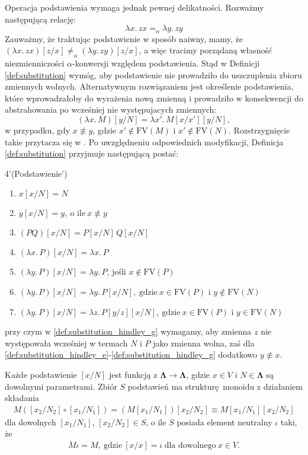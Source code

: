 Operacja podstawienia wymaga jednak pewnej delikatności. Rozważmy następującą relację:
\[
  \lambda x.\,zx=_{\alpha}\lambda y.\,zy
\]
Zauważmy, że traktując podstawienie w sposób naiwny, mamy, że \((\lambda x.\,zx)[z/x]\neq_{\alpha}(\lambda y.\,zy)[z/x]\), a więc tracimy porządaną własność niezmienniczości \(\alpha\)-konwersji względem podstawienia. Stąd w Definicji \ref{def:substitution} wymóg, aby podstawienie nie prowadziło do uszczuplenia zbioru zmiennych wolnych. Alternatywnym rozwiązaniem jest określenie podstawienia, które wprowadzałoby do wyrażenia nową zmienną i prowadziło w konsekwencji do abstrahowania po wcześniej nie występujacych zmiennych:
\[
  (\lambda x.\,M)[y/N] = \lambda x'.\,M[x/x'][y/N],
\]
w przypadku, gdy \(x\not\equiv y\), gdzie \(x'\not\in\mathrm{FV}(M)\) i \(x'\not\in\mathrm{FV}(N)\). Rozstrzygnięcie takie przytacza się w \cite{Hindley:2008:LCI:1388400,}. Po uwzględneniu odpowiednich modyfikacji, Definicja \ref{def:substitution} przyjmuje następującą postać:
\begin{customdef}{4'}(Podstawienie')\label{def:untyped_substitution_hindley}
  \begin{enumerate}[label={(S'\arabic*)}, ref={(S'\arabic*)}]
    \setlength\itemsep{0em}
    \item \(x[x/N] = N\)
    \item \(y[x/N] = y,\ \text{o ile}\ x\not\equiv y\)
    \item \((PQ)[x/N] = P[x/N]\,Q[x/N]\)
    \item \((\lambda x.\, P)[x/N] = \lambda x.\,P\)
    \item \((\lambda y.\, P)[x/N] = \lambda y.\,P\), jeśli \(x\not\in\mathrm{FV}(P)\)\label{def:substitution_e}\label{def:substitution_hindley_e}
    \item \((\lambda y.\, P)[x/N] = \lambda y.\,P[x/N],\ \text{gdzie}\ x\in\mathrm{FV}(P)\) i \(y\not\in\mathrm{FV}(N)\)\label{def:substitution_hindley_f}
    \item \((\lambda y.\, P)[x/N] = \lambda z.\,P[y/z][x/N],\ \text{gdzie}\ x\in\mathrm{FV}(P)\) i \(y\in\mathrm{FV}(N)\)\label{def:substitution_hindley_g}
  \end{enumerate}
  przy czym w \ref{def:substitution_hindley_g} wymagamy, aby zmienna \(z\) nie występowała wcześniej w termach \(N\) i \(P\) jako zmienna wolna, zaś dla \ref{def:substitution_hindley_e}-\ref{def:substitution_hindley_g} dodatkowo \(y\not\equiv x\).
\end{customdef}
\begin{uwaga}
Każde podstawienie \([x/N]\) jest funkcją z \(\mathbf{\Lambda}\to\mathbf{\Lambda}\), gdzie \(x\in V\) i \(N\in\mathbf{\Lambda}\) są dowolnymi parametrami. Zbiór \(S\) podstawień ma strukturę monoidu z działaniem składania
  \begin{align*}
    M([x_2/N_2]\circ[x_1/N_1]) = (M[x_1/N_1])[x_2/N_2] \equiv M[x_1/N_1][x_2/N_2]
  \end{align*}
  dla dowolnych \([x_1/N_1],\,[x_2/N_2]\in S\), o ile \(S\) posiada element neutralny \(\iota\) taki, że
  \begin{align*}
    M \iota = M,\ \text{gdzie}\ [x/x]=\iota\ \text{dla dowolnego}\ x\in V.
  \end{align*}
\end{uwaga}

